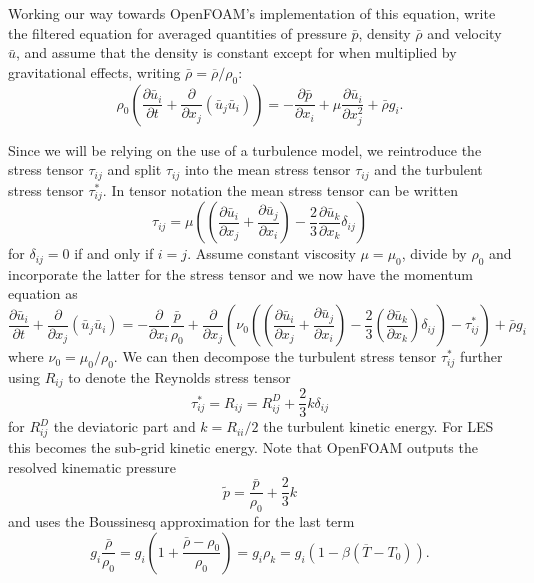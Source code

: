 \documentclass[12pt]{report}
\begin{document}
Working our way towards OpenFOAM's implementation of this equation, write the filtered equation for averaged quantities of pressure $\bar{p}$, density $\bar{\rho}$ and velocity $\bar{u}$, and assume that the density is constant except for when multiplied by gravitational effects, writing $\bar{\rho} = \overline{\rho} / \rho _0$:
\begin{equation} \rho _0 \left ( \frac{\partial \bar{u}_i}{\partial t} + \frac{\partial}{\partial x_j} \left( \bar{u}_j \bar{u}_i \right) \right )
= -\frac{\partial \bar{p}} {\partial{x_i}} +  \mu \frac{\partial \bar{u}_i}{\partial x_j^2} + \bar{\rho} g_i. \end{equation}

Since we will be relying on the use of a turbulence model, we reintroduce the stress tensor $\tau _{ij}$ and split $\tau_{ij}$ into the mean stress tensor $\tau _{ij}$ and the turbulent stress tensor $\tau ^* _{ij}$.
In tensor notation the mean stress tensor can be written
\begin{equation*} \tau _{ij} = \mu \left ( \left ( \frac{\partial \bar{u} _i}{\partial x_j} + \frac{\partial \bar{u} _j }{\partial x_i} \right) - \frac{2}{3} \frac{\partial \bar{u}_k} {\partial x_k} \delta _{ij} \right ) \end{equation*}
for $\delta _{ij} = 0$ if and only if $i=j$.
Assume constant viscosity $\mu = \mu _0$, divide by $\rho _0$ and incorporate the latter for the stress tensor and we now have the momentum equation as
\begin{equation*} \frac{\partial \bar{u}_i}{\partial t} + \frac{\partial}{\partial x_j} \left( \bar{u}_j \bar{u}_i \right) 
= -\frac{\partial } {\partial{x_i}} \frac{\bar{p}}{\rho_0} + \frac{\partial }{\partial x_j} \left ( \nu _0 \left ( \left ( \frac{\partial \bar{u}_i} {\partial x_j} + \frac{\partial \bar{u} _j}{\partial x_i} \right ) - \frac{2}{3}\left ( \frac{\partial \bar{u} _k}{\partial x_k }\right ) \delta _{ij}\right ) - \tau ^* _{ij} \right ) + \bar{\rho} g_i \end{equation*}
where $\nu _0 = \mu _0 /\rho _0$.
We can then decompose the turbulent stress tensor $\tau ^* _{ij}$ further using $R_{ij}$ to denote the Reynolds stress tensor
\begin{equation*} \tau ^* _{ij} = R_{ij} = R^D _{ij} + \frac{2}{3} k \delta _{ij} \end{equation*}
for $R_{ij}^D$ the deviatoric part and $k = R_{ii}/2$ the turbulent kinetic energy.
For LES this becomes the sub-grid kinetic energy.
Note that OpenFOAM outputs the resolved kinematic pressure
\begin{equation*} \tilde{p} = \frac{\bar{p} }{\rho _0} + \frac{2}{3}k \end{equation*}
and uses the Boussinesq approximation for the last term
\begin{equation*} g_i\frac{\bar{\rho}}{\rho _0} = g_i \left ( 1 + \frac{\bar{\rho} - \rho _0}{\rho _0} \right ) = g_i \rho _k  = g_i \left (1 - \beta \left (\overline{T} - T _0\right ) \right ) .\end{equation*}
\end{document}
